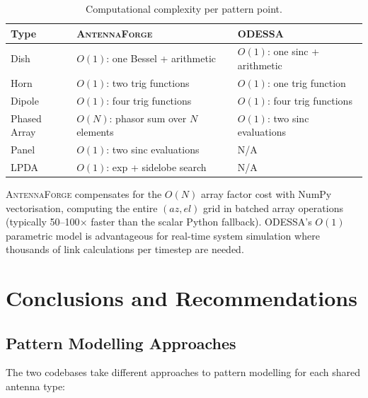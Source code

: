 \documentclass[11pt,a4paper]{article}
\newcommand{\AF}{\textsc{AntennaForge}}
\newcommand{\OD}{\textsc{ODESSA}}
\begin{document}
\begin{table}[H]
\centering
\caption{Computational complexity per pattern point.}
\small
\begin{tabularx}{\textwidth}{l X X}
\toprule
\textbf{Type} & \textbf{\AF{}} & \textbf{\OD{}} \\
\midrule
Dish & $O(1)$: one Bessel + arithmetic & $O(1)$: one sinc + arithmetic \\
Horn & $O(1)$: two trig functions & $O(1)$: one trig function \\
Dipole & $O(1)$: four trig functions & $O(1)$: four trig functions \\
Phased Array & $O(N)$: phasor sum over $N$ elements & $O(1)$: two sinc evaluations \\
Panel & $O(1)$: two sinc evaluations & N/A \\
LPDA & $O(1)$: exp + sidelobe search & N/A \\
\bottomrule
\end{tabularx}
\end{table}

\AF{} compensates for the $O(N)$ array factor cost with NumPy vectorisation,
computing the entire $(az, el)$ grid in batched array operations (typically
50--100$\times$ faster than the scalar Python fallback).  \OD{}'s $O(1)$
parametric model is advantageous for real-time system simulation where thousands
of link calculations per timestep are needed.

\section{Conclusions and Recommendations}
\label{sec:conclusions}

\subsection{Pattern Modelling Approaches}

The two codebases take different approaches to pattern modelling for each
shared antenna type:
\end{document}
